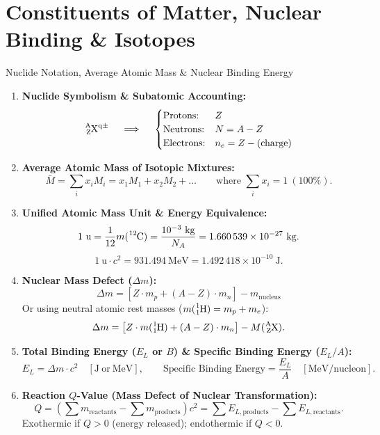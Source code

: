 \chapter{Constituents of Matter, Nuclear Binding \& Isotopes}
\label{chap:exo_ch02}

\begin{quicksummary}{Nuclide Notation, Average Atomic Mass \& Nuclear Binding Energy}
\begin{enumerate}[leftmargin=1.4em,itemsep=3pt]
  \item \textbf{Nuclide Symbolism \& Subatomic Accounting:}
  \[
  \ce{^{A}_{Z}X^{q\pm}} \quad \implies \quad 
  \begin{cases}
  \text{Protons:} & Z \\
  \text{Neutrons:} & N = A - Z \\
  \text{Electrons:} & n_e = Z - (\text{charge})
  \end{cases}
  \]
  \item \textbf{Average Atomic Mass of Isotopic Mixtures:}
  \[
  \bar{M} = \sum_{i} x_i M_i = x_1 M_1 + x_2 M_2 + \dots \qquad \text{where } \sum_i x_i = 1\ (100\%).
  \]
  \item \textbf{Unified Atomic Mass Unit \& Energy Equivalence:}
  \[
  1\ \mathrm{u} = \frac{1}{12} m(\ce{^{12}C}) = \frac{10^{-3}\ \mathrm{kg}}{N_A} = 1.660\,539 \times 10^{-27}\ \mathrm{kg}.
  \]
  \[
  1\ \mathrm{u} \cdot c^2 = 931.494\ \mathrm{MeV} = 1.492\,418 \times 10^{-10}\ \mathrm{J}.
  \]
  \item \textbf{Nuclear Mass Defect ($\Delta m$):}
  \[
  \Delta m = \left[ Z \cdot m_p + (A - Z) \cdot m_n \right] - m_{\text{nucleus}}
  \]
  Or using neutral atomic rest masses ($m(\ce{^1_1H}) = m_p + m_e$):
  \[
  \Delta m = \left[ Z \cdot m(\ce{^1_1H}) + (A - Z) \cdot m_n \right] - M(\ce{^{A}_{Z}X}).
  \]
  \item \textbf{Total Binding Energy ($E_L$ or $B$) \& Specific Binding Energy ($E_L/A$):}
  \[
  E_L = \Delta m \cdot c^2 \quad [\mathrm{J\ or\ MeV}], \qquad \text{Specific Binding Energy} = \frac{E_L}{A} \quad [\mathrm{MeV/nucleon}].
  \]
  \item \textbf{Reaction $Q$-Value (Mass Defect of Nuclear Transformation):}
  \[
  Q = \left( \sum m_{\text{reactants}} - \sum m_{\text{products}} \right) c^2 = \sum E_{L,\text{products}} - \sum E_{L,\text{reactants}}.
  \]
  Exothermic if $Q > 0$ (energy released); endothermic if $Q < 0$.
\end{enumerate}
\end{quicksummary}

